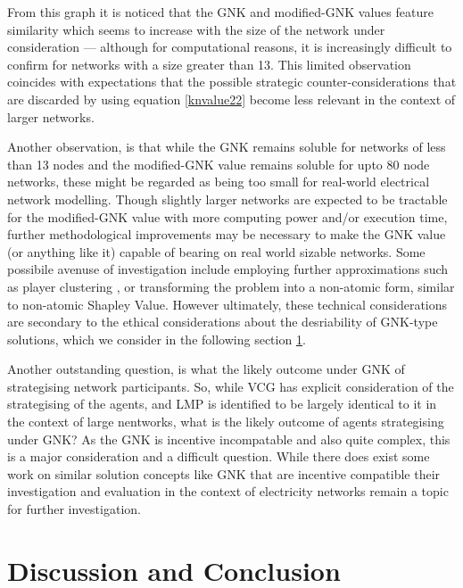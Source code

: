From this graph it is noticed that the GNK and modified-GNK values feature similarity which seems to increase with the size of the network under consideration --- although for computational reasons, it is increasingly difficult to confirm for networks with a size greater than 13.
This limited observation coincides with expectations that the possible strategic counter-considerations that are discarded by using equation \ref{knvalue22} become less relevant in the context of larger networks.

Another observation, is that while the GNK remains soluble for networks of less than 13 nodes and the modified-GNK value remains soluble for upto 80 node networks, these might be regarded as being too small for real-world electrical network modelling.
Though slightly larger networks are expected to be tractable for the modified-GNK value with more computing power and/or execution time, further methodological improvements may be necessary to make the GNK value (or anything like it) capable of bearing on real world sizable networks.
Some possibile avenuse of investigation include employing further approximations such as player clustering \cite{DBLP:journals/corr/abs-1903-10965}, or transforming the problem into a non-atomic form, similar to non-atomic Shapley Value.
However ultimately, these technical considerations are secondary to the ethical considerations about the desriability of GNK-type solutions, which we consider in the following section \ref{sec:GNK_value_discussion}.

Another outstanding question, is what the likely outcome under GNK of strategising network participants.
So, while VCG has explicit consideration of the strategising of the agents, and LMP is identified to be largely identical to it in the context of large nentworks, what is the likely outcome of agents strategising under GNK?
As the GNK is incentive incompatable and also quite complex, this is a major consideration and a difficult question.
While there does exist some work on similar solution concepts like GNK that are incentive compatible \cite{myerson1,Salamanca2019} their investigation and evaluation in the context of electricity networks remain a topic for further investigation.




\section{Discussion and Conclusion}\label{sec:GNK_value_discussion}

